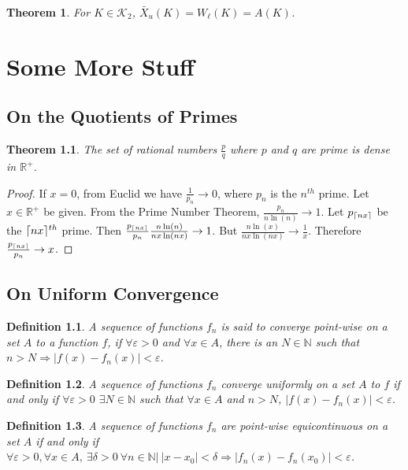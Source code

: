 \documentclass[oneside]{book}
\theoremstyle{mystyle}
\newtheorem{theorem}{Theorem}[section]
\newtheorem{definition}{Definition}[section]
\DeclarePairedDelimiter\ceil{\lceil}{\rceil}
\begin{document}
\begin{theorem}
For $K\in \mathscr{K}_2$, $\bar{X}_{u}(K) = W_{\ell}(K)=A(K)$.
\end{theorem}
%
\chapter{Some More Stuff}
\section{On the Quotients of Primes}
\begin{theorem}
The set of rational numbers $\frac{p}{q}$ where $p$ and $q$ are prime is dense in $\mathbb{R}^{+}$.
\end{theorem}
\begin{proof}
If $x=0$, from Euclid we have $\frac{1}{p_n}\rightarrow 0$, where $p_n$ is the $n^{th}$ prime. Let $x\in\mathbb{R}^{+}$ be given. From the Prime Number Theorem, $\frac{p_n}{n\ln(n)}\rightarrow 1$. Let $p_{\ceil{nx}}$ be the $\ceil{nx}^{th}$ prime. Then $\frac{p_{\ceil{nx}}}{p_n}\frac{n\ln(n)}{nx\ln(nx)}\rightarrow 1$. But $\frac{n\ln(x)}{nx\ln(nx)}\rightarrow \frac{1}{x}$. Therefore $\frac{p_{\ceil{nx}}}{p_n}\rightarrow x$.
\end{proof}
%
\section{On Uniform Convergence}
%
\begin{definition}
A sequence of functions $f_n$ is said to converge point-wise on a set $A$ to a function $f$, if $\forall\varepsilon>0$ and $\forall x\in A$, there is an $N\in\mathbb{N}$ such that $n>N \Rightarrow |f(x)-f_n(x)|<\varepsilon$.
\end{definition}

\begin{definition}
A sequence of functions $f_n$ converge uniformly on a set $A$ to $f$ if and only if $\forall \varepsilon>0$ $\exists N\in\mathbb{N}$ such that $\forall x \in A$ and $n>N$, $|f(x) -f_n(x)|<\varepsilon$.
\end{definition}

\begin{definition}
A sequence of functions $f_n$ are point-wise equicontinuous on a set $A$ if and only if $\forall \varepsilon>0, \forall x \in A,\ \exists \delta>0\ \forall n\in\mathbb{N}|\ |x-x_0|<\delta \Rightarrow |f_n(x) - f_n(x_0)|<\varepsilon$.
\end{definition}
\end{document}
